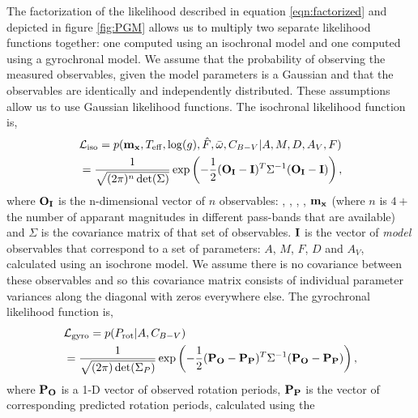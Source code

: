 The factorization of the likelihood described in equation \ref{eqn:factorized}
and depicted in figure \ref{fig:PGM} allows us to multiply two separate
likelihood functions together: one computed using an isochronal model and one
computed using a gyrochronal model.
We assume that the probability of observing the measured observables, given
the model parameters is a Gaussian and that the observables are identically
and independently distributed.
These assumptions allow us to use Gaussian likelihood functions.
The isochronal likelihood function is,
\begin{eqnarray} \label{eqn:isochrones_only_likelihood}
    & \mathcal{L_{\mathrm{iso}}} = p({\bf m_x}, T_{\mathrm{eff}}, \log(g),
    \hat{F},
    \bar{\omega}, C_{B-V}|A, M, D,
    A_V, F) \\ \nonumber
    & = \frac{1}{\sqrt{(2\pi)^n \det(\Sigma)}}
    \exp\left( -\frac{1}{2} ({\bf O_I} - {\bf I})^T \Sigma ^{-1}
    ({\bf O_I} - {\bf I})\right),
\end{eqnarray}
where ${\bf O_I}$ is the n-dimensional vector of $n$ observables: \teff,
\logg, \fhat, \pmega, ${\bf m_x}$ (where $n$ is $4 + $ the number of
apparant magnitudes in different pass-bands that are available) and $\Sigma$
is the covariance matrix of that set of observables.
${\bf I}$ is the vector of {\it model} observables that correspond to a set of
parameters: $A$, $M$, $F$, $D$ and $A_V$, calculated using an isochrone model.
We assume there is no covariance between these observables and so this
covariance matrix consists of individual parameter variances along the
diagonal with zeros everywhere else.
The gyrochronal likelihood function is,
\begin{eqnarray} \label{eqn:gyro_likelihood}
    & \mathcal{L_{\mathrm{gyro}}} = p(P_\mathrm{rot} |A, C_{B-V}) \\ \nonumber
    & = \frac{1}{\sqrt{(2\pi) \det(\Sigma_P)}}
    \exp\left( -\frac{1}{2} ({\bf P_O} - {\bf P_P})^T \Sigma ^{-1}
    ({\bf P_O} - {\bf P_P})\right),
\end{eqnarray}
where ${\bf P_O}$ is a 1-D vector of observed rotation periods, ${\bf P_P}$ is
the vector of corresponding predicted rotation periods, calculated using the
